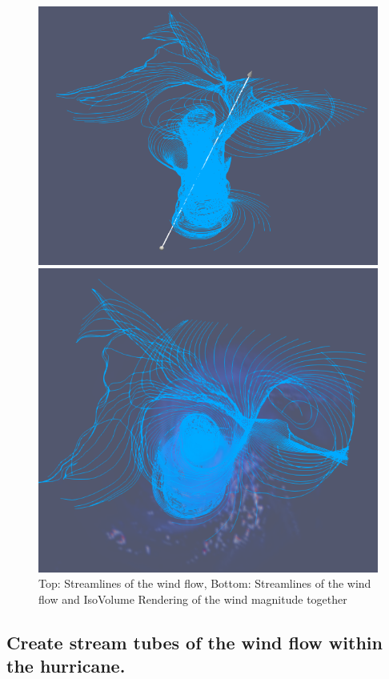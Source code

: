 \documentclass[a4paper,11pt]{article}
\theoremstyle{mytheor}
\begin{document}
\begin{figure}[!h]
    \centering
    \includegraphics[scale=0.6]{Figures/P2_1_1.PNG}
    
    \vspace{1 cm}
    \includegraphics[scale=0.56]{Figures/P2_1_2.PNG}
    \caption{Top: Streamlines of the wind flow, Bottom: Streamlines of the wind flow and IsoVolume Rendering of the wind magnitude together}
    \label{p2_1}
\end{figure}

\clearpage
\subsection{Create stream tubes of the wind flow within the hurricane.}
\end{document}
